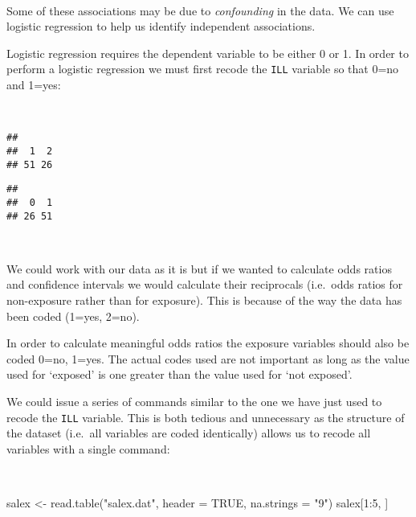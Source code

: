\documentclass[
  12pt,
  a4paper]{book}
\newenvironment{Shaded}{\begin{snugshade}}{\end{snugshade}}
\newcommand{\AttributeTok}[1]{\textcolor[rgb]{0.77,0.63,0.00}{#1}}
\newcommand{\ConstantTok}[1]{\textcolor[rgb]{0.00,0.00,0.00}{#1}}
\newcommand{\DecValTok}[1]{\textcolor[rgb]{0.00,0.00,0.81}{#1}}
\newcommand{\FunctionTok}[1]{\textcolor[rgb]{0.00,0.00,0.00}{#1}}
\newcommand{\NormalTok}[1]{#1}
\newcommand{\OtherTok}[1]{\textcolor[rgb]{0.56,0.35,0.01}{#1}}
\newcommand{\SpecialCharTok}[1]{\textcolor[rgb]{0.00,0.00,0.00}{#1}}
\newcommand{\StringTok}[1]{\textcolor[rgb]{0.31,0.60,0.02}{#1}}
\begin{document}
~

Some of these associations may be due to \emph{confounding} in the data. We can use logistic regression to help us identify independent associations.

Logistic regression requires the dependent variable to be either 0 or 1. In order to perform a logistic regression we must first recode the \texttt{ILL} variable so that 0=no and 1=yes:

~

\begin{Shaded}
\end{Shaded}

\begin{verbatim}
## 
##  1  2 
## 51 26
\end{verbatim}

\begin{verbatim}
## 
##  0  1 
## 26 51
\end{verbatim}

~

We could work with our data as it is but if we wanted to calculate odds ratios and confidence intervals we would calculate their reciprocals (i.e.~odds ratios for non-exposure rather than for exposure). This is because of the way the data has been coded (1=yes, 2=no).

In order to calculate meaningful odds ratios the exposure variables should also be coded 0=no, 1=yes. The actual codes used are not important as long as the value used for `exposed' is one greater than the value used for `not exposed'.

We could issue a series of commands similar to the one we have just used to recode the \texttt{ILL} variable. This is both tedious and unnecessary as the structure of the dataset (i.e.~all variables are coded identically) allows us to recode all variables with a single command:

~

\begin{Shaded}
\begin{Highlighting}[]
\NormalTok{salex }\OtherTok{\textless{}{-}} \FunctionTok{read.table}\NormalTok{(}\StringTok{"salex.dat"}\NormalTok{, }\AttributeTok{header =} \ConstantTok{TRUE}\NormalTok{, }\AttributeTok{na.strings =} \StringTok{"9"}\NormalTok{)}
\NormalTok{salex[}\DecValTok{1}\SpecialCharTok{:}\DecValTok{5}\NormalTok{, ]}
\end{Highlighting}
\end{Shaded}
\end{document}
